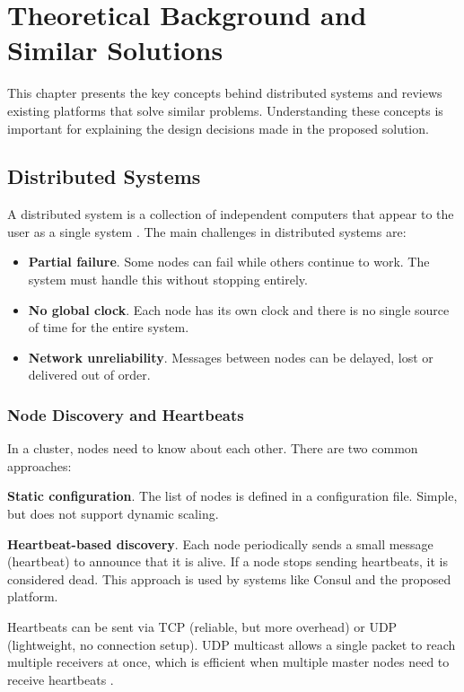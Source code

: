 \chapter{Theoretical Background and Similar Solutions}
\label{cap:cap2}

This chapter presents the key concepts behind distributed systems and reviews existing platforms that solve similar problems. Understanding these concepts is important for explaining the design decisions made in the proposed solution.

\section{Distributed Systems}

A distributed system is a collection of independent computers that appear to the user as a single system \cite{book:tanenbaum:ds:2017}. The main challenges in distributed systems are:

\begin{itemize}
    \item \textbf{Partial failure}. Some nodes can fail while others continue to work. The system must handle this without stopping entirely.
    \item \textbf{No global clock}. Each node has its own clock and there is no single source of time for the entire system.
    \item \textbf{Network unreliability}. Messages between nodes can be delayed, lost or delivered out of order.
\end{itemize}

\subsection{Node Discovery and Heartbeats}

In a cluster, nodes need to know about each other. There are two common approaches:

\textbf{Static configuration}. The list of nodes is defined in a configuration file. Simple, but does not support dynamic scaling.

\textbf{Heartbeat-based discovery}. Each node periodically sends a small message (heartbeat) to announce that it is alive. If a node stops sending heartbeats, it is considered dead. This approach is used by systems like Consul \cite{misc:web:consul} and the proposed platform.

Heartbeats can be sent via TCP (reliable, but more overhead) or UDP (lightweight, no connection setup). UDP multicast allows a single packet to reach multiple receivers at once, which is efficient when multiple master nodes need to receive heartbeats \cite{book:stevens:unp:2003}.

